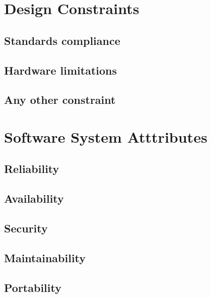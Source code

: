 \section{Design Constraints}
\subsection{Standards compliance}
\subsection{Hardware limitations}
\subsection{Any other constraint}

\section{Software System Atttributes}
\subsection{Reliability}
\subsection{Availability}
\subsection{Security}
\subsection{Maintainability}
\subsection{Portability}


